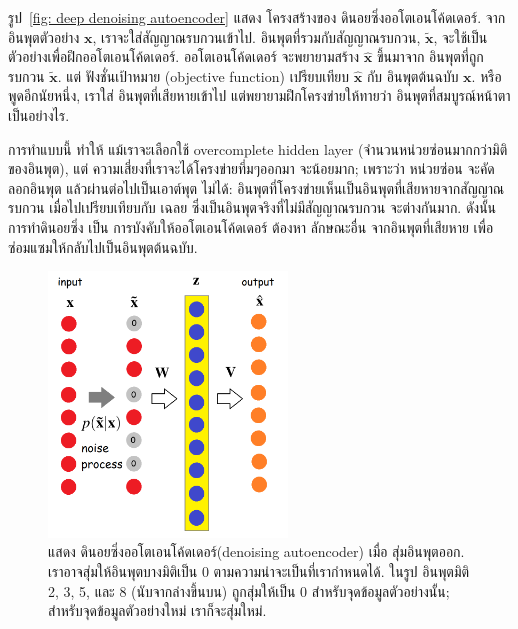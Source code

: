 รูป~\ref{fig: deep denoising autoencoder} แสดง โครงสร้างของ ดินอยซิ่งออโตเอนโค้ดเดอร์.
จากอินพุตตัวอย่าง $\mathbf{x}$, เราจะใส่สัญญาณรบกวนเข้าไป.
อินพุตที่รวมกับสัญญาณรบกวน, $\mathbf{\tilde{x}}$, จะใช้เป็น ตัวอย่างเพื่อฝึกออโตเอนโค้ดเดอร์.
ออโตเอนโค้ดเดอร์ จะพยายามสร้าง $\hat{\mathbf{x}}$ ขึ้นมาจาก อินพุตที่ถูกรบกวน $\mathbf{\tilde{x}}$.
แต่ ฟังชั่นเป้าหมาย (objective function) เปรียบเทียบ $\hat{\mathbf{x}}$ กับ อินพุตต้นฉบับ $\mathbf{x}$.
หรือ พูดอีกนัยหนึ่ง, เราใส่ อินพุตที่เสียหายเข้าไป แต่พยายามฝึกโครงข่ายให้ทายว่า อินพุตที่สมบูรณ์หน้าตาเป็นอย่างไร.

การทำแบบนี้ ทำให้ แม้เราจะเลือกใช้ overcomplete hidden layer (จำนวนหน่วยซ่อนมากกว่ามิติของอินพุต), แต่ ความเสี่ยงที่เราจะได้โครงข่ายทึ่มๆออกมา จะน้อยมาก;
เพราะว่า หน่วยซ่อน จะคัดลอกอินพุต แล้วผ่านต่อไปเป็นเอาต์พุต ไม่ได้:
อินพุตที่โครงข่ายเห็นเป็นอินพุตที่เสียหายจากสัญญาณรบกวน เมื่อไปเปรียบเทียบกับ เฉลย ซึ่งเป็นอินพุตจริงที่ไม่มีสัญญาณรบกวน จะต่างกันมาก.
ดังนั้น การทำดินอยซิ่ง เป็น การบังคับให้ออโตเอนโค้ดเดอร์ ต้องหา ลักษณะอื่น จากอินพุตที่เสียหาย เพื่อ ซ่อมแซมให้กลับไปเป็นอินพุตต้นฉบับ.




%
\begin{figure}
\begin{center}
\includegraphics[width=2.5in]{04ANNDeep/binaryDenoisingAutoencoder.png}
\end{center}
\caption{แสดง ดินอยซิ่งออโตเอนโค้ดเดอร์(denoising autoencoder) เมื่อ สุ่มอินพุตออก.
เราอาจสุ่มให้อินพุตบางมิติเป็น $0$ ตามความน่าจะเป็นที่เรากำหนดได้.
ในรูป อินพุตมิติ 2, 3, 5, และ 8 (นับจากล่างขึ้นบน) ถูกสุ่มให้เป็น $0$ สำหรับจุดข้อมูลตัวอย่างนั้น; สำหรับจุดข้อมูลตัวอย่างใหม่ เราก็จะสุ่มใหม่.}
\label{fig: deep binary denoising autoencoder}
\end{figure}
%

